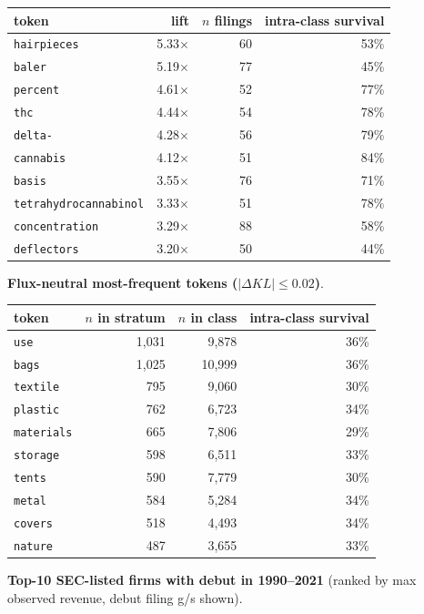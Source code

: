 \begin{tabular}{lrrr}
\toprule
token & lift & $n$ filings & intra-class survival \\
\midrule
\texttt{hairpieces} & 5.33$\times$ & 60 & 53\% \\
\texttt{baler} & 5.19$\times$ & 77 & 45\% \\
\texttt{percent} & 4.61$\times$ & 52 & 77\% \\
\texttt{thc} & 4.44$\times$ & 54 & 78\% \\
\texttt{delta-} & 4.28$\times$ & 56 & 79\% \\
\texttt{cannabis} & 4.12$\times$ & 51 & 84\% \\
\texttt{basis} & 3.55$\times$ & 76 & 71\% \\
\texttt{tetrahydrocannabinol} & 3.33$\times$ & 51 & 78\% \\
\texttt{concentration} & 3.29$\times$ & 88 & 58\% \\
\texttt{deflectors} & 3.20$\times$ & 50 & 44\% \\
\bottomrule
\end{tabular}

\textbf{Flux-neutral most-frequent tokens ($|\Delta KL|\leq 0.02$)}.

\begin{tabular}{lrrr}
\toprule
token & $n$ in stratum & $n$ in class & intra-class survival \\
\midrule
\texttt{use} & 1,031 & 9,878 & 36\% \\
\texttt{bags} & 1,025 & 10,999 & 36\% \\
\texttt{textile} & 795 & 9,060 & 30\% \\
\texttt{plastic} & 762 & 6,723 & 34\% \\
\texttt{materials} & 665 & 7,806 & 29\% \\
\texttt{storage} & 598 & 6,511 & 33\% \\
\texttt{tents} & 590 & 7,779 & 30\% \\
\texttt{metal} & 584 & 5,284 & 34\% \\
\texttt{covers} & 518 & 4,493 & 34\% \\
\texttt{nature} & 487 & 3,655 & 33\% \\
\bottomrule
\end{tabular}

\textbf{Top-10 SEC-listed firms with debut in 1990--2021} (ranked by max observed revenue, debut filing g/s shown).

